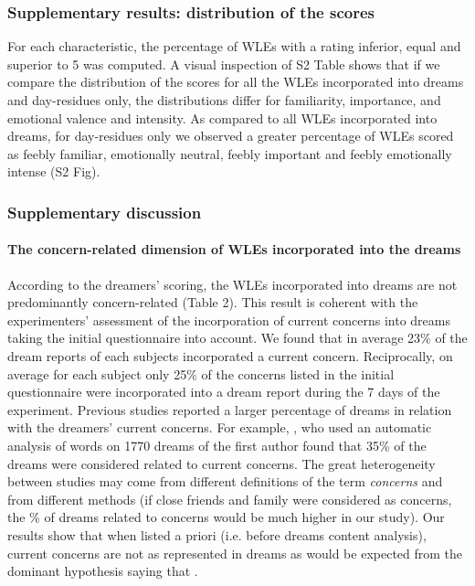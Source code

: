 \subsubsection*{Supplementary results: distribution of the scores }
For each characteristic, the percentage of WLEs with a rating inferior, equal and superior to 5 was computed. A visual inspection of S2 Table shows that if we compare the distribution of the scores for all the WLEs incorporated into dreams and day-residues only, the distributions differ for familiarity, importance, and emotional valence and intensity. As compared to all WLEs incorporated into dreams, for day-residues only we observed a greater percentage of WLEs scored as feebly familiar, emotionally neutral, feebly important and feebly emotionally intense (S2 Fig).

\subsubsection*{Supplementary discussion}
\paragraph{The concern-related dimension of WLEs incorporated into the dreams}

According to the dreamers’ scoring, the WLEs incorporated into dreams are not predominantly concern-related (Table 2). This result is coherent with the experimenters’ assessment of the incorporation of current concerns into dreams taking the initial questionnaire into account. We found that in average 23\% of the dream reports of each subjects incorporated a current concern. Reciprocally, on average for each subject only 25\% of the concerns listed in the initial questionnaire were incorporated into a dream report during the 7 days of the experiment. Previous studies reported a larger percentage of dreams in relation with the dreamers’ current concerns. For example, \citet{schwartz_sleep_2002}, who used an automatic analysis of words on 1770 dreams of the first author found that 35\% of the dreams were considered related to current concerns. The great heterogeneity between studies may come from different definitions of the term \emph{concerns} and from different methods (if close friends and family were considered as concerns, the \% of dreams related to concerns would be much higher in our study). Our results show that when listed a priori (i.e. before dreams content analysis), current concerns are not as represented in dreams as would be expected from the dominant hypothesis saying that  \citep{domhoff_studying_2008}.

